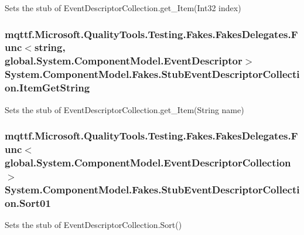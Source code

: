 Sets the stub of Event\-Descriptor\-Collection.\-get\-\_\-\-Item(\-Int32 index)

\hypertarget{class_system_1_1_component_model_1_1_fakes_1_1_stub_event_descriptor_collection_a6c0d579f0674086e30d2df90c0611e51}{
\subsubsection[{Item\-Get\-String}]{\setlength{\rightskip}{0pt plus 5cm}mqttf.\-Microsoft.\-Quality\-Tools.\-Testing.\-Fakes.\-Fakes\-Delegates.\-Func$<$string, global.\-System.\-Component\-Model.\-Event\-Descriptor$>$ System.\-Component\-Model.\-Fakes.\-Stub\-Event\-Descriptor\-Collection.\-Item\-Get\-String}}\label{class_system_1_1_component_model_1_1_fakes_1_1_stub_event_descriptor_collection_a6c0d579f0674086e30d2df90c0611e51}


Sets the stub of Event\-Descriptor\-Collection.\-get\-\_\-\-Item(\-String name)

\hypertarget{class_system_1_1_component_model_1_1_fakes_1_1_stub_event_descriptor_collection_a6b628640a0115e0e22d474ffbcd56114}{
\subsubsection[{Sort01}]{\setlength{\rightskip}{0pt plus 5cm}mqttf.\-Microsoft.\-Quality\-Tools.\-Testing.\-Fakes.\-Fakes\-Delegates.\-Func$<$global.\-System.\-Component\-Model.\-Event\-Descriptor\-Collection$>$ System.\-Component\-Model.\-Fakes.\-Stub\-Event\-Descriptor\-Collection.\-Sort01}}\label{class_system_1_1_component_model_1_1_fakes_1_1_stub_event_descriptor_collection_a6b628640a0115e0e22d474ffbcd56114}


Sets the stub of Event\-Descriptor\-Collection.\-Sort()

